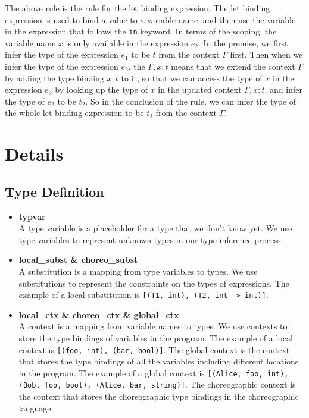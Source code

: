 \documentclass{article}
\begin{document}
    The above rule is the rule for the let binding expression. The let binding expression is used to bind a value to a variable name,
    and then use the variable in the expression that follows the \texttt{in} keyword.
    In terms of the scoping, the variable name $x$ is only available in the expression $e_2$.
    In the premise, we first infer the type of the expression $e_1$ to be $t$ from the context $\Gamma$ first.
    Then when we infer the type of the expression $e_2$, the $\Gamma, x:t$ means that we extend the context $\Gamma$ by adding the type binding $x:t$ to it,
    so that we can access the type of $x$ in the expression $e_2$ by looking up the type of $x$ in the updated context $\Gamma, x:t$, and infer the type of $e_2$ to be $t_2$.
    So in the conclusion of the rule, we can infer the type of the whole let binding expression to be $t_2$ from the context $\Gamma$.

    \newpage %


\section{Details}
\subsection{Type Definition}
    \begin{itemize}
        \item \textbf{typvar} \\
              A type variable is a placeholder for a type that we don't know yet. We use type variables to represent unknown types in our type inference process.
        \item \textbf{local\_subst \& choreo\_subst} \\
              A substitution is a mapping from type variables to types. We use substitutions to represent the constraints on the types of expressions. The example of a local substitution is \texttt{[(T1, int), (T2, int -> int)]}.
        \item \textbf{local\_ctx \& choreo\_ctx \& global\_ctx} \\
              A context is a mapping from variable names to types. We use contexts to store the type bindings of variables in the program. The example of a local context is \texttt{[(foo, int), (bar, bool)]}.
              The global context is the context that stores the type bindings of all the variables including different locations in the program.
              The example of a global context is \texttt{[(Alice, foo, int), (Bob, foo, bool), (Alice, bar, string)]}.
              The choreographic context is the context that stores the choreographic type bindings in the choreographic language.
    \end{itemize}
\end{document}
